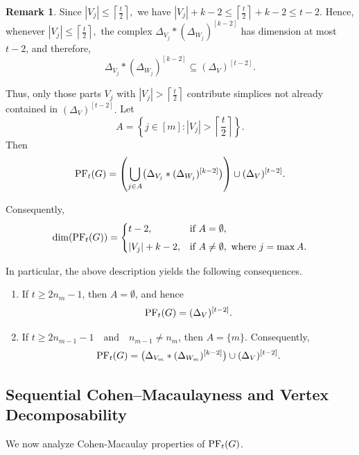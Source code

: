 \documentclass[12pt,reqno]{amsart}
\theoremstyle{definition}
\newtheorem{remark}[remark]{Remark}
\newcommand{\PF}{{\rm PF}}
\begin{document}
\begin{remark}\label{rem: dim}
Since
$
|V_j| \le \left\lceil \frac{t}{2} \right\rceil,
$
we have
$
|V_j|+k-2
\le
\left\lceil \frac{t}{2} \right\rceil+k-2
\le t-2.
$
Hence, whenever
$
|V_j| \le \left\lceil \frac{t}{2} \right\rceil,
$
the complex
$
\Delta_{V_j} * (\Delta_{W_j})^{[k-2]}
$
has dimension at most $t-2$, and therefore,
\[
\Delta_{V_j} * (\Delta_{W_j})^{[k-2]}
\subseteq
(\Delta_V)^{[t-2]}.
\]

Thus, only those parts $V_j$ with
$
|V_j| > \left\lceil \frac{t}{2} \right\rceil
$
contribute simplices not already contained in
$
(\Delta_V)^{[t-2]}.
$
Let
$$
A=\left\{j\in[m] : |V_j| > \left\lceil \frac{t}{2} \right\rceil\right\}.
$$
Then
$$
\PF_t(G)=
\left(
\bigcup_{j\in A}
\bigl(
\Delta_{V_j} * (\Delta_{W_j})^{[k-2]}
\bigr)
\right)
\cup
(\Delta_V)^{[t-2]}.
$$

Consequently,
\[
\dim(\PF_t(G))=
\begin{cases}
t-2, & \text{if } A=\emptyset,\\[4pt]
|V_j|+k-2, & \text{if } A\neq\emptyset,\ \text{where } j=\max A.
\end{cases}
\]

In particular, the above description yields the following consequences.
\begin{enumerate}
    \item If $t\ge 2n_m-1$, then \(A=\emptyset\), and hence
    \[
    \PF_t(G)=(\Delta_V)^{[t-2]}.
    \]

    \item If $t\ge 2n_{m-1}-1
    \quad\text{and}\quad
    n_{m-1}\neq n_m$, then \(A=\{m\}\). Consequently,
    \[
    \PF_t(G)=
    \bigl(
    \Delta_{V_m} * (\Delta_{W_m})^{[k-2]}
    \bigr)
    \cup
    (\Delta_V)^{[t-2]}.
    \]
\end{enumerate}

\end{remark}



\subsection{Sequential Cohen–Macaulayness and Vertex Decomposability}
We now analyze Cohen-Macaulay properties of $\PF_t(G)$. 
\end{document}
